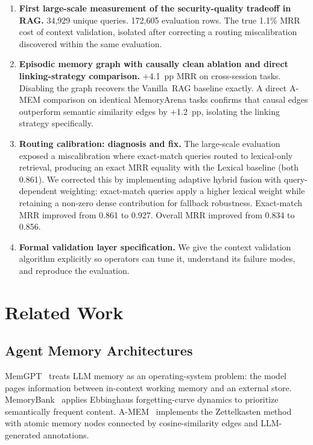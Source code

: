 \documentclass[sigconf,authordraft]{acmart}
\begin{document}
\begin{enumerate}
\item \textbf{First large-scale measurement of the security-quality
tradeoff in RAG.} 34,929 unique queries. 172,605 evaluation rows. The true
1.1\% MRR cost of context validation, isolated after correcting a routing
miscalibration discovered within the same evaluation.

\item \textbf{Episodic memory graph with causally clean ablation and
direct linking-strategy comparison.} $+$4.1~pp MRR on cross-session tasks.
Disabling the graph recovers the Vanilla~RAG baseline exactly. A direct
A-MEM comparison on identical MemoryArena tasks confirms that causal
edges outperform semantic similarity edges by $+$1.2~pp, isolating the
linking strategy specifically.

\item \textbf{Routing calibration: diagnosis and fix.} The large-scale
evaluation exposed a miscalibration where exact-match queries routed to
lexical-only retrieval, producing an exact MRR equality with the Lexical
baseline (both 0.861). We corrected this by implementing adaptive hybrid
fusion with query-dependent weighting: exact-match queries apply a higher
lexical weight while retaining a non-zero dense contribution for fallback
robustness. Exact-match MRR improved from 0.861 to 0.927. Overall MRR
improved from 0.834 to 0.856.

\item \textbf{Formal validation layer specification.} We give the
context validation algorithm explicitly so operators can tune it,
understand its failure modes, and reproduce the evaluation.
\end{enumerate}

\section{Related Work}

\subsection{Agent Memory Architectures}

MemGPT~\cite{packer2023memgpt} treats LLM memory as an operating-system
problem: the model pages information between in-context working memory
and an external store. MemoryBank~\cite{zhong2023memorybank} applies
Ebbinghaus forgetting-curve dynamics to prioritize semantically frequent
content. A-MEM~\cite{xu2024amem} implements the Zettelkasten method with
atomic memory nodes connected by cosine-similarity edges and
LLM-generated annotations.
\end{document}
